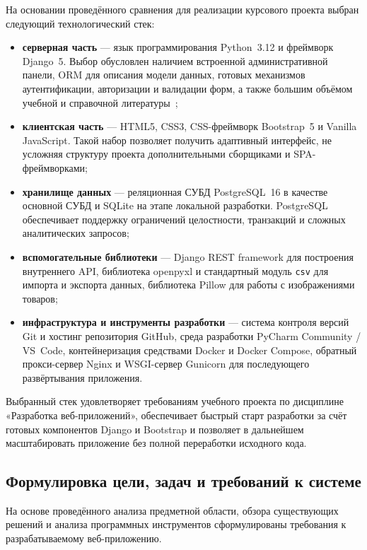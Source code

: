 На основании проведённого сравнения для реализации курсового проекта выбран следующий технологический стек:
\begin{itemize}
    \item \textbf{серверная часть} --- язык программирования Python~3.12 и фреймворк Django~5. Выбор обусловлен наличием встроенной административной панели, ORM для описания модели данных, готовых механизмов аутентификации, авторизации и валидации форм, а также большим объёмом учебной и справочной литературы~\cite{hawkins2022django};
    \item \textbf{клиентская часть} --- HTML5, CSS3, CSS-фреймворк Bootstrap~5 и Vanilla JavaScript. Такой набор позволяет получить адаптивный интерфейс, не усложняя структуру проекта дополнительными сборщиками и SPA-фреймворками;
    \item \textbf{хранилище данных} --- реляционная СУБД PostgreSQL~16 в качестве основной СУБД и SQLite на этапе локальной разработки. PostgreSQL обеспечивает поддержку ограничений целостности, транзакций и сложных аналитических запросов;
    \item \textbf{вспомогательные библиотеки} --- Django REST framework для построения внутреннего API, библиотека openpyxl и стандартный модуль \texttt{csv} для импорта и экспорта данных, библиотека Pillow для работы с изображениями товаров;
    \item \textbf{инфраструктура и инструменты разработки} --- система контроля версий Git и хостинг репозитория GitHub, среда разработки PyCharm Community / VS~Code, контейнеризация средствами Docker и Docker Compose, обратный прокси-сервер Nginx и WSGI-сервер Gunicorn для последующего развёртывания приложения.
\end{itemize}

Выбранный стек удовлетворяет требованиям учебного проекта по дисциплине «Разработка веб-приложений», обеспечивает быстрый старт разработки за счёт готовых компонентов Django и Bootstrap и позволяет в дальнейшем масштабировать приложение без полной переработки исходного кода.

\subsection{Формулировка цели, задач и требований к системе}

На основе проведённого анализа предметной области, обзора существующих решений и анализа программных инструментов сформулированы требования к разрабатываемому веб-приложению.

